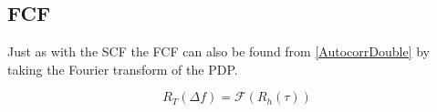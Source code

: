 \subsection{\Gls{FCF}}
\label{bc_aprox}
%
%

Just as with the SCF the FCF can also be found from \autoref{AutocorrDouble} by taking the Fourier transform of the \gls{PDP}. 

\begin{equation}
R_{T}(\Delta f) = \mathcal{F}(R_{h}(\tau))
\end{equation}

